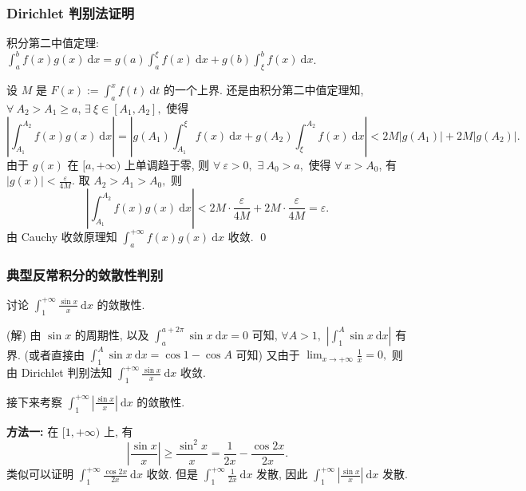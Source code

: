 
\begin{frame}
\frametitle{Dirichlet 判别法证明}

积分第二中值定理: $\int_a^b f(x)g(x) ~ \mathrm{d} x = g(a) \int_a^{\xi} f(x) ~ \mathrm{d} x + g(b) \int_{\xi}^b f(x) ~ \mathrm{d} x$.

\vspace{1em}

设 $M$ 是 $F(x) := \int_a^x f(t) ~ \mathrm{d} t$ 的一个上界. 还是由积分第二中值定理知, $\forall ~ A_2 > A_1 \geqslant a$, $\exists ~ \xi \in [A_1, A_2],$ 使得
\[
\left| \int_{A_1}^{A_2} f(x)g(x) ~ \mathrm{d} x \right| = \left| g(A_1) \int_{A_1}^{\xi} f(x) ~ \mathrm{d} x + g(A_2) \int_{\xi}^{A_2} f(x) ~ \mathrm{d} x \right| < 2M |g(A_1)| + 2M |g(A_2)|.
\]
由于 $g(x)$ 在 $[a, +\infty)$ 上单调趋于零, 则 $\forall ~ \varepsilon > 0,$ $\exists ~ A_0 > a,$ 使得 $\forall ~ x > A_0$, 有 $|g(x)| < \frac{\varepsilon}{4M}.$ 取 $A_2 > A_1 > A_0,$ 则
\[
\left| \int_{A_1}^{A_2} f(x)g(x) ~ \mathrm{d} x \right| < 2M \cdot \frac{\varepsilon}{4M} + 2M \cdot \frac{\varepsilon}{4M} = \varepsilon.
\]
由 Cauchy 收敛原理知 $\displaystyle \int_a^{+\infty} f(x)g(x) ~ \mathrm{d} x$ 收敛.
\qed

\end{frame}


\begin{frame}
\frametitle{典型反常积分的敛散性判别}

\begin{eg}
讨论 $\displaystyle \int_1^{+\infty} \frac{\sin x}{x} ~ \mathrm{d} x$ 的敛散性.
\end{eg}

\pause

\startproof[bg=yellow, fg=red](解)
由 $\sin x$ 的周期性, 以及 $\displaystyle \int_{a}^{a+2\pi} \sin x ~ \mathrm{d} x = 0$ 可知, $\forall A > 1,$ $\displaystyle \left| \int_1^A \sin x ~ \mathrm{d} x \right|$ 有界. (或者直接由 $\displaystyle \int_1^A \sin x ~ \mathrm{d} x = \cos 1 - \cos A$ 可知) 又由于 $\displaystyle \lim_{x \to +\infty} \frac{1}{x} = 0,$ 则由 Dirichlet 判别法知 $\displaystyle \int_1^{+\infty} \frac{\sin x}{x} ~ \mathrm{d} x$ 收敛.

\pause
\vspace{0.5em}

接下来考察 $\displaystyle \int_1^{+\infty} \left| \frac{\sin x}{x} \right| ~ \mathrm{d} x$ 的敛散性.

\textbf{方法一:} 在 $[1, +\infty)$ 上, 有
\[
\left| \frac{\sin x}{x} \right| \geqslant \frac{\sin^2 x}{x} =  \frac{1}{2x} - \frac{\cos 2x}{2x}.
\]
类似可以证明 $\displaystyle \int_1^{+\infty} \frac{\cos 2x}{2x} ~ \mathrm{d} x$ 收敛. 但是 $\displaystyle \int_1^{+\infty} \frac{1}{2x} ~ \mathrm{d} x$ 发散, 因此 $\displaystyle \int_1^{+\infty} \left| \frac{\sin x}{x} \right| ~ \mathrm{d} x$ 发散.

\end{frame}

